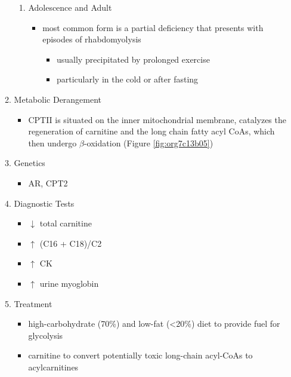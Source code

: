 \documentclass{scrartcl}
\begin{document}
\begin{enumerate}
\begin{enumerate}
\begin{enumerate}
\item Adolescence and Adult
\label{sec:org8ea0679}
\begin{itemize}
\item most common form is a partial deficiency that presents with
episodes of rhabdomyolysis
\begin{itemize}
\item usually precipitated by prolonged exercise
\item particularly in the cold or after fasting
\end{itemize}
\end{itemize}
\end{enumerate}

\item Metabolic Derangement
\label{sec:orge4bff7b}
\begin{itemize}
\item CPTII is situated on the inner mitochondrial membrane, catalyzes the
regeneration of carnitine and the long chain fatty acyl CoAs, which
then undergo \(\beta\)-oxidation (Figure \ref{fig:org7c13b05})
\end{itemize}
\item Genetics
\label{sec:orge1e95fa}
\begin{itemize}
\item AR, CPT2
\end{itemize}
\item Diagnostic Tests
\label{sec:org4ae3c7a}
\begin{itemize}
\item \(\downarrow\) total carnitine
\item \(\uparrow\) (C16 + C18)/C2
\item \(\uparrow\) CK
\item \(\uparrow\) urine myoglobin
\end{itemize}
\item Treatment
\label{sec:org725ddc0}
\begin{itemize}
\item high-carbohydrate (70\%) and low-fat (<20\%) diet to provide fuel for glycolysis
\item carnitine to convert potentially toxic long-chain acyl-CoAs to
acylcarnitines
\end{itemize}
\end{enumerate}
\end{enumerate}
\end{document}
